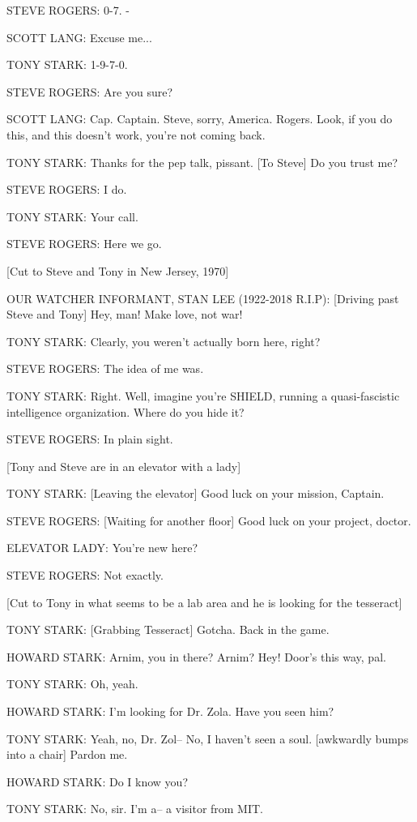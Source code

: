 STEVE ROGERS: 0-7. -

SCOTT LANG: Excuse me...

TONY STARK: 1-9-7-0.

STEVE ROGERS: Are you sure?

SCOTT LANG: Cap. Captain. Steve, sorry, America. Rogers. Look, if you do this, and this doesn't work, you're not coming back.

TONY STARK: Thanks for the pep talk, pissant. [To Steve] Do you trust me?

STEVE ROGERS: I do.

TONY STARK: Your call.

STEVE ROGERS: Here we go.

[Cut to Steve and Tony in New Jersey, 1970]

OUR WATCHER INFORMANT, STAN LEE (1922-2018 R.I.P): [Driving past Steve and Tony] Hey, man! Make love, not war!

TONY STARK: Clearly, you weren't actually born here, right?

STEVE ROGERS: The idea of me was.

TONY STARK: Right. Well, imagine you're SHIELD, running a quasi-fascistic intelligence organization. Where do you hide it?

STEVE ROGERS: In plain sight.

[Tony and Steve are in an elevator with a lady]

TONY STARK: [Leaving the elevator] Good luck on your mission, Captain.

STEVE ROGERS: [Waiting for another floor] Good luck on your project, doctor.

ELEVATOR LADY: You're new here?

STEVE ROGERS: Not exactly.

[Cut to Tony in what seems to be a lab area and he is looking for the tesseract]

TONY STARK: [Grabbing Tesseract] Gotcha. Back in the game.

HOWARD STARK: Arnim, you in there? Arnim? Hey! Door's this way, pal.

TONY STARK: Oh, yeah.

HOWARD STARK: I'm looking for Dr. Zola. Have you seen him?

TONY STARK: Yeah, no, Dr. Zol– No, I haven't seen a soul. [awkwardly bumps into a chair] Pardon me.

HOWARD STARK: Do I know you?

TONY STARK: No, sir. I'm a– a visitor from MIT.


